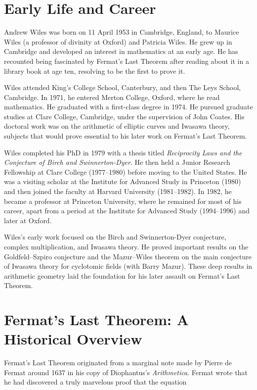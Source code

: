 \section{Early Life and Career}

Andrew Wiles was born on 11 April 1953 in Cambridge, England, to Maurice Wiles (a professor of divinity at Oxford) and Patricia Wiles. He grew up in Cambridge and developed an interest in mathematics at an early age. He has recounted being fascinated by Fermat's Last Theorem after reading about it in a library book at age ten, resolving to be the first to prove it.

Wiles attended King's College School, Canterbury, and then The Leys School, Cambridge. In 1971, he entered Merton College, Oxford, where he read mathematics. He graduated with a first-class degree in 1974. He pursued graduate studies at Clare College, Cambridge, under the supervision of John Coates. His doctoral work was on the arithmetic of elliptic curves and Iwasawa theory, subjects that would prove essential to his later work on Fermat's Last Theorem.

Wiles completed his PhD in 1979 with a thesis titled \textit{Reciprocity Laws and the Conjecture of Birch and Swinnerton-Dyer}. He then held a Junior Research Fellowship at Clare College (1977--1980) before moving to the United States. He was a visiting scholar at the Institute for Advanced Study in Princeton (1980) and then joined the faculty at Harvard University (1981--1982). In 1982, he became a professor at Princeton University, where he remained for most of his career, apart from a period at the Institute for Advanced Study (1994--1996) and later at Oxford.

Wiles's early work focused on the Birch and Swinnerton-Dyer conjecture, complex multiplication, and Iwasawa theory. He proved important results on the Goldfeld--Szpiro conjecture and the Mazur--Wiles theorem on the main conjecture of Iwasawa theory for cyclotomic fields (with Barry Mazur). These deep results in arithmetic geometry laid the foundation for his later assault on Fermat's Last Theorem.

\section{Fermat's Last Theorem: A Historical Overview}

Fermat's Last Theorem originated from a marginal note made by Pierre de Fermat around 1637 in his copy of Diophantus's \textit{Arithmetica}. Fermat wrote that he had discovered a truly marvelous proof that the equation

